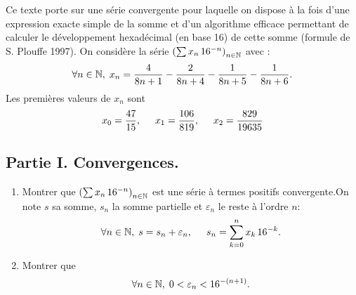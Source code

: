 Ce texte porte sur une série convergente pour laquelle on dispose à la fois d'une expression exacte simple de la somme et d'un algorithme efficace permettant de calculer le développement hexadécimal (en base 16) de cette somme (formule de S. Plouffe 1997).\newline
On considère la série $\left( \sum x_n \, 16^{-n}\right)_{n \in \mathbb{N}}$ avec :
\begin{displaymath}
\forall n\in \mathbb{N}, \; 
x_n = \frac{4}{8n+1} - \frac{2}{8n+4} - \frac{1}{8n+5} - \frac{1}{8n+6}.
\end{displaymath}
Les premières valeurs de $x_n$ sont
\begin{displaymath}
 x_0 = \frac{47}{15}, \hspace{0.5cm} x_1 = \frac{106}{819}, \hspace{0.5cm} x_2 = \frac{829}{19635}
\end{displaymath}


\subsection*{Partie I. Convergences.}
\begin{enumerate}
 
 \item Montrer que $\left( \sum x_n \, 16^{-n}\right)_{n \in \mathbb{N}}$ est une série à termes positifs convergente.\newline  On note $s$ sa somme, $s_n$ la somme partielle et $\varepsilon_n$ le reste à l'ordre $n$:
\begin{displaymath}
\forall n \in \mathbb{N}, \; s = s_n + \varepsilon_n, \hspace{0.5cm} s_n = \sum_{k=0}^{n}x_k\,16^{-k} .
\end{displaymath}

 \item Montrer que 
\begin{displaymath}
\forall n \in \mathbb{N}, \;  0 < \varepsilon_n < 16^{-(n + 1)}.
\end{displaymath}
\end{enumerate}


